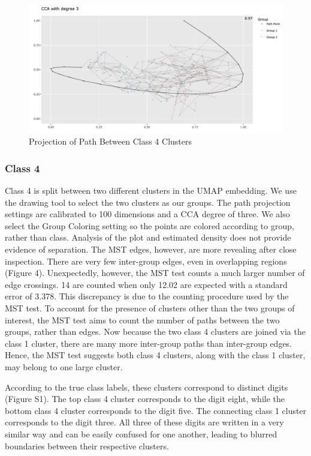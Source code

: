 \documentclass{article}
\begin{document}
{\renewcommand{\figurename}{Figure}
\renewcommand{\thefigure}{4}
\begin{figure}[!b]
\centering
\includegraphics[scale=0.32]{class 4 projection MNIST}
\caption{Projection of Path Between Class 4 Clusters}
\end{figure}

\subsubsection{Class 4}
Class 4 is split between two different clusters in the UMAP embedding. We use the drawing tool to select the two clusters as our groups. The path projection settings are calibrated to 100 dimensions and a CCA degree of three. We also select the Group Coloring setting so the points are colored according to group, rather than class. Analysis of the plot and estimated density does not provide evidence of separation. The MST edges, however, are more revealing after close inspection. There are very few inter-group edges, even in overlapping regions (Figure 4). Unexpectedly, however, the MST test counts a much larger number of edge crossings. 14 are counted when only 12.02 are expected with a standard error of 3.378. This discrepancy is due to the counting procedure used by the MST test. To account for the presence of clusters other than the two groups of interest, the MST test aims to count the number of paths between the two groups, rather than edges. Now because the two class 4 clusters are joined via the class 1 cluster, there are many more inter-group paths than inter-group edges. Hence, the MST test suggests both class 4 clusters, along with the class 1 cluster, may belong to one large cluster.

According to the true class labels, these clusters correspond to distinct digits (Figure S1). The top class 4 cluster corresponds to the digit eight, while the bottom class 4 cluster corresponds to the digit five. The connecting class 1 cluster corresponds to the digit three. All three of these digits are written in a very similar way and can be easily confused for one another, leading to blurred boundaries between their respective clusters.

}
\end{document}
